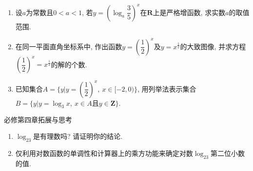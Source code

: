 \documentclass[10pt,a4paper]{article}
\begin{document}
\begin{enumerate}[1.]
{   
}
\vspace*{3cm}
\item 设$a$为常数且$0<a<1$, 若$y=(\log_a \dfrac 35)^x$在$\mathbf{R}$上是严格增函数, 求实数$a$的取值范围.
\vspace*{3cm}
\item 在同一平面直角坐标系中, 作出函数$y=(\dfrac 12)^x$及$y=x^{\frac 12}$的大致图像, 并求方程$(\dfrac 12)^x=x^{\frac 12}$的解的个数.
\vspace*{3cm}
\item 已知集合$A=\{y|y=(\dfrac 12)^x,\  x\in [-2, 0)\}$, 用列举法表示集合$B=\{y|y=\log_3x,\  x\in A\text{且}y\in \mathbf{Z}\}$.
\vspace*{3cm}
\end{enumerate}

必修第四章拓展与思考
\begin{enumerate}[1.]

\item $\log_23$是有理数吗? 请证明你的结论.
\vspace*{3cm}
\item 仅利用对数函数的单调性和计算器上的乘方功能来确定对数$\log_23$第二位小数的值.
\vspace*{3cm}
\end{enumerate}
\end{document}
